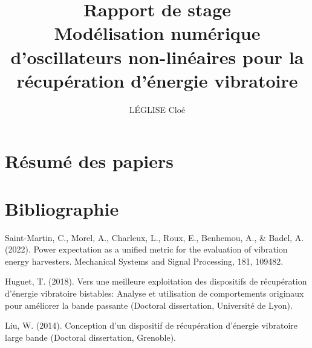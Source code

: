 \documentclass[a4paper, french, 12pt, titlepage]{report}
\title{Rapport de stage \\ Modélisation numérique d’oscillateurs non-linéaires pour
la récupération d’énergie vibratoire}
\author{LÉGLISE Cloé}
\begin{document}
\maketitle

\section*{Résumé des papiers}





\section*{Bibliographie}

Saint-Martin, C., Morel, A., Charleux, L., Roux, E., Benhemou, A., & Badel, A. (2022). Power expectation as a unified metric for the evaluation of vibration energy harvesters. Mechanical Systems and Signal Processing, 181, 109482.

Huguet, T. (2018). Vers une meilleure exploitation des dispositifs de récupération d’énergie vibratoire bistables: Analyse et utilisation de comportements originaux pour améliorer la bande passante (Doctoral dissertation, Université de Lyon).

Liu, W. (2014). Conception d'un dispositif de récupération d'énergie vibratoire large bande (Doctoral dissertation, Grenoble).
\end{document}
